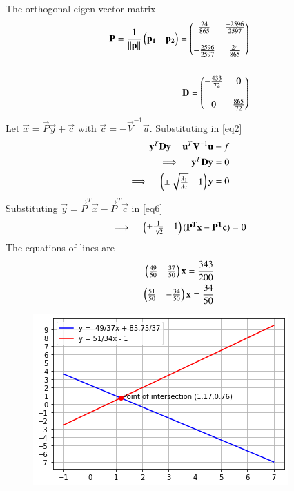 \documentclass[journal,12pt,twocolumn]{IEEEtran}
\begin{document}
The orthogonal eigen-vector matrix
\begin{align}
	\mathbf{P}=\frac{1}{\left\lVert\mathbf{p}\right\rVert}\begin{pmatrix}\mathbf{p_1} & \mathbf{p_2}\end{pmatrix}
	=\begin{pmatrix}\frac{24}{865} & \frac{-2596}{2597} \\  & \\ 
	-\frac{2596}{2597} & \frac{24}{865}\end{pmatrix} \\  \nonumber \\
	\mathbf{D}=\begin{pmatrix}-\frac{433}{72} & 0 \\ & \\ 0 & \frac{865}{72}\end{pmatrix}
\end{align}
Let $\vec{x}=\vec{P}\vec{y} + \vec{c} $ with $\vec{c}=-\vec{V}^{-1}\vec{u}$. Substituting in \ref{eq2}
\begin{align}
	\vec{y}^T\vec{D}\vec{y}=\vec{u}^T\vec{V}^{-1}\vec{u}-f \\
	\implies \quad \vec{y}^T\vec{D}\vec{y}=0 \\
	\implies \quad \myvec{\pm\sqrt{\frac{\lambda_1}{\lambda_2}} & 1}\vec{y}=0   \label{eq6}
\end{align}
Substituting $\vec{y}=\vec{P}^T\vec{x} - \vec{P}^T\vec{c}$ in \ref{eq6} 
\begin{align}
	\implies \quad \begin{pmatrix}\pm{\frac{1}{\sqrt{2}}} & 1\end{pmatrix}(\mathbf{\mathbf{P}^T\mathbf{x}-\mathbf{P}^T\mathbf{c}})=0 
\end{align}
The equations of lines are 
\begin{align}
	\begin{pmatrix}\frac{49}{50} & \frac{37}{50}\end{pmatrix}\mathbf{x} = \frac{343}{200} \\
	\begin{pmatrix}\frac{51}{50} & -\frac{34}{50}\end{pmatrix}\mathbf{x} = \frac{34}{50} 
\end{align}
\begin{figure}[!h]
	\includegraphics[width=\columnwidth]{lines.png}
	\caption{} \label{linefig1}
\end{figure}
\end{document}
